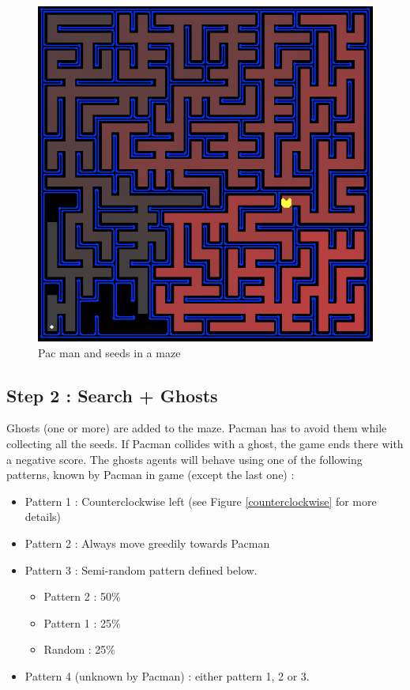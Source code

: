 \documentclass[12pt,a4paper,BCOR12mm, headexclude, footexclude, twoside, openright]{scrartcl}
\numberwithin{equation}{section} %
\numberwithin{figure}{section} %
\numberwithin{table}{section} %
\begin{document}
\begin{figure}
	\label{fullmaze}
	\begin{center}
	
	\includegraphics[scale=0.5]{pacmazefull.png}
    \caption{Pac man and seeds in a maze}
    \end{center}
\end{figure}





\subsection{Step 2 : Search + Ghosts}

Ghosts (one or more) are added to the maze. Pacman has to avoid them while collecting all the seeds. If Pacman collides with a ghost, the game ends there with a negative score. The ghosts agents will behave using one of the following patterns, known by Pacman in game (except the last one) :

\begin{itemize}
	\item Pattern 1 : Counterclockwise left (see Figure \ref{counterclockwise} for more details) 
    \item Pattern 2 : Always move greedily towards Pacman
    \item Pattern 3 : Semi-random pattern defined below.
    \begin{itemize}
    	\item Pattern 2 : 50\% 
        \item Pattern 1 : 25\%
        \item Random : 25\%
    \end{itemize}
    \item Pattern 4 (unknown by Pacman) : either pattern 1, 2 or 3.
\end{itemize}
\end{document}
